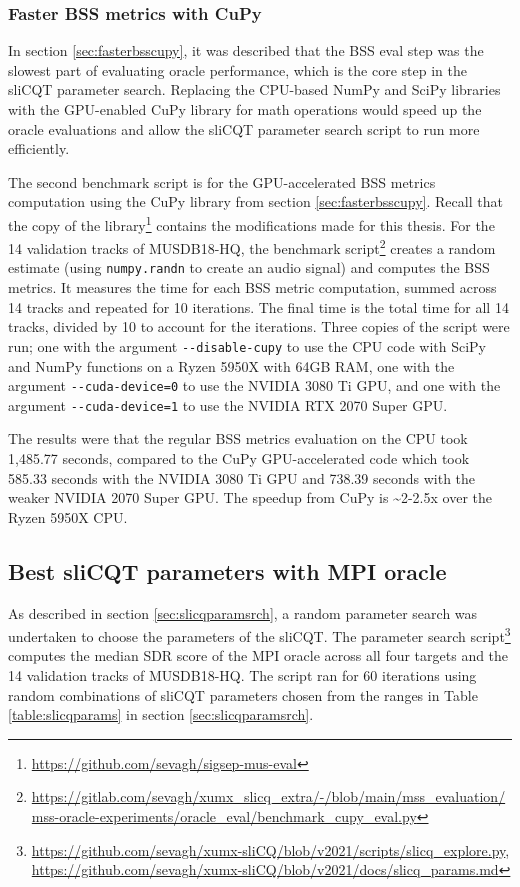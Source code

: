 \documentclass[report.tex]{subfiles}
\begin{document}
\subsubsection{Faster BSS metrics with CuPy}

In section \ref{sec:fasterbsscupy}, it was described that the BSS eval step was the slowest part of evaluating oracle performance, which is the core step in the sliCQT parameter search. Replacing the CPU-based NumPy and SciPy libraries with the GPU-enabled CuPy library for math operations would speed up the oracle evaluations and allow the sliCQT parameter search script to run more efficiently.

The second benchmark script is for the GPU-accelerated BSS metrics computation using the CuPy library from section \ref{sec:fasterbsscupy}. Recall that the copy of the library\footnote{\url{https://github.com/sevagh/sigsep-mus-eval}} contains the modifications made for this thesis. For the 14 validation tracks of MUSDB18-HQ, the benchmark script\footnote{\url{https://gitlab.com/sevagh/xumx_slicq_extra/-/blob/main/mss_evaluation/mss-oracle-experiments/oracle_eval/benchmark_cupy_eval.py}}  creates a random estimate (using \Verb#numpy.randn# to create an audio signal) and computes the BSS metrics. It measures the time for each BSS metric computation, summed across 14 tracks and repeated for 10 iterations. The final time is the total time for all 14 tracks, divided by 10 to account for the iterations. Three copies of the script were run; one with the argument \Verb#--disable-cupy# to use the CPU code with SciPy and NumPy functions on a Ryzen 5950X with 64GB RAM, one with the argument \Verb#--cuda-device=0# to use the NVIDIA 3080 Ti GPU, and one with the argument \Verb#--cuda-device=1# to use the NVIDIA RTX 2070 Super GPU.

The results were that the regular BSS metrics evaluation on the CPU took 1,485.77 seconds, compared to the CuPy GPU-accelerated code which took 585.33 seconds with the NVIDIA 3080 Ti GPU and 738.39 seconds with the weaker NVIDIA 2070 Super GPU. The speedup from CuPy is \textasciitilde 2-2.5x over the Ryzen 5950X CPU.

\newpagefill

\subsection{Best sliCQT parameters with MPI oracle}

As described in section \ref{sec:slicqparamsrch}, a random parameter search was undertaken to choose the parameters of the sliCQT. The parameter search script\footnote{\url{https://github.com/sevagh/xumx-sliCQ/blob/v2021/scripts/slicq_explore.py}, \url{https://github.com/sevagh/xumx-sliCQ/blob/v2021/docs/slicq_params.md}} computes the median SDR score of the MPI oracle across all four targets and the 14 validation tracks of MUSDB18-HQ. The script ran for 60 iterations using random combinations of sliCQT parameters chosen from the ranges in Table \ref{table:slicqparams} in section \ref{sec:slicqparamsrch}.
\end{document}
